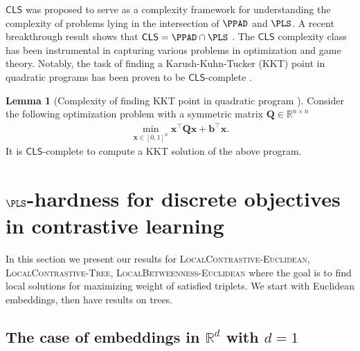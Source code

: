 \documentclass{article}
\theoremstyle{definition}  %
\newtheorem{lemma}{Lemma}
\theoremstyle{plain}
\numberwithin{observation}{section}
\numberwithin{claim}{section}
\numberwithin{fact}{section}
\numberwithin{lemma}{section}
\numberwithin{proposition}{section}
\numberwithin{theorem}{section}
\numberwithin{corollary}{section}
\numberwithin{definition}{section}
\def\vb{{\bm{b}}}
\def\vx{{\bm{x}}}
\newcommand{\mat}[1]{\mathbf{#1}}
\newcommand{\CLS}{\mathsf{CLS}}
\theoremstyle{plain}
\begin{document}
$\CLS$ was proposed to serve as a complexity framework for understanding the complexity of problems lying in the intersection of $\PPAD$ and $\PLS$. A recent breakthrough result shows that $\CLS = \PPAD \cap \PLS$ \citep{fearnley2024complexity}. The $\CLS$ complexity class has been instrumental in capturing various problems in optimization and game theory. Notably, the task of finding a Karush-Kuhn-Tucker (KKT) point in quadratic programs has been proven to be $\CLS$-complete \citep{fearnley2024complexity}.

\begin{lemma}[Complexity of finding KKT point in quadratic program \citep{fearnley2024complexity}] \label{lemma:quadratic_KKT_CLS}
    Consider the following optimization problem with a symmetric matrix $\mat{Q} \in \mathbb{R}^{n \times n}$
    \begin{align*}
      \min_{\vx \in [0, 1]^n} \vx^\top \mat{Q} \vx + \vb^\top \vx.
    \end{align*}
    It is $\CLS$-complete to compute a KKT solution of the above program.
\end{lemma}
\fi


\section{\texorpdfstring{$\PLS$}{PLS}-hardness for discrete objectives in contrastive learning}\label{sec:hardness-pls}


In this section we present our results for  \textsc{LocalContrastive-Euclidean}, \textsc{LocalContrastive-Tree}, \textsc{LocalBetweenness-Euclidean} where the goal is to find local solutions for maximizing weight of satisfied triplets. We start with Euclidean embeddings, then have results on trees.%


\subsection{The case of embeddings in \texorpdfstring{$\mathbb{R}^d$}{Rd} with \texorpdfstring{$d=1$}{d=1}}\label{sec:hardness-1d}
\end{document}
